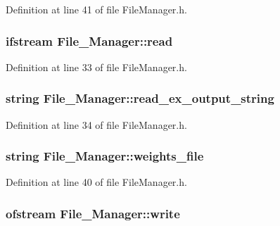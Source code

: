 Definition at line 41 of file File\-Manager.\-h.

\hypertarget{a00001_a035fb2bdf99f8f928d049bc950c81f4c}{
\subsubsection[{read}]{\setlength{\rightskip}{0pt plus 5cm}ifstream File\-\_\-\-Manager\-::read\hspace{0.3cm}{\ttfamily [private]}}}\label{d8/d84/a00001_a035fb2bdf99f8f928d049bc950c81f4c}


Definition at line 33 of file File\-Manager.\-h.

\hypertarget{a00001_af7d8ea2c0a997e16600478c0020b1858}{
\subsubsection[{read\-\_\-ex\-\_\-output\-\_\-string}]{\setlength{\rightskip}{0pt plus 5cm}string File\-\_\-\-Manager\-::read\-\_\-ex\-\_\-output\-\_\-string\hspace{0.3cm}{\ttfamily [private]}}}\label{d8/d84/a00001_af7d8ea2c0a997e16600478c0020b1858}


Definition at line 34 of file File\-Manager.\-h.

\hypertarget{a00001_aab02256124e6eb39e10e3c9765f0bcb3}{
\subsubsection[{weights\-\_\-file}]{\setlength{\rightskip}{0pt plus 5cm}string File\-\_\-\-Manager\-::weights\-\_\-file\hspace{0.3cm}{\ttfamily [private]}}}\label{d8/d84/a00001_aab02256124e6eb39e10e3c9765f0bcb3}


Definition at line 40 of file File\-Manager.\-h.

\hypertarget{a00001_a7d29cb8d04a1a60638f653c28a628095}{
\subsubsection[{write}]{\setlength{\rightskip}{0pt plus 5cm}ofstream File\-\_\-\-Manager\-::write\hspace{0.3cm}{\ttfamily [private]}}}\label{d8/d84/a00001_a7d29cb8d04a1a60638f653c28a628095}


